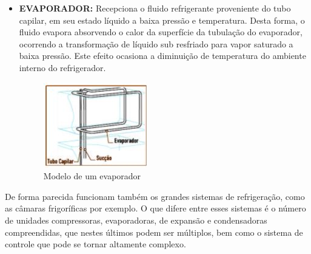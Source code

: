\begin{itemize}
		\item  \textbf{EVAPORADOR:} Recepciona o fluido refrigerante proveniente do tubo capilar, em seu estado líquido a baixa pressão e temperatura. Desta forma, o fluido evapora absorvendo o calor da superfície da tubulação do evaporador, ocorrendo a transformação de líquido sub resfriado para vapor saturado a baixa pressão. Este efeito ocasiona a diminuição de temperatura do ambiente interno do refrigerador.
					\begin{figure}[H]
						\begin{center}
							\includegraphics[scale=1]{figuras/Evaporador.JPG}
							\caption{Modelo de um evaporador}
						\end{center}
					\end{figure}
					
			\end{itemize}
	
		De forma parecida funcionam também os grandes sistemas de refrigeração, como as câmaras frigoríficas por exemplo. O que difere entre esses sistemas é o número de unidades compressoras, evaporadoras, de expansão e condensadoras compreendidas, que nestes últimos podem ser múltiplos, bem como o sistema de controle que pode se tornar altamente complexo.
	